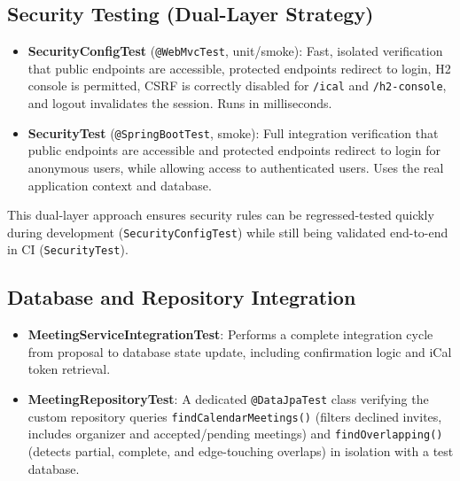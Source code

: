 \documentclass[11pt]{article}
\begin{document}
  \subsection{Security Testing (Dual-Layer Strategy)}
  \begin{itemize}
    \item \textbf{SecurityConfigTest} (\texttt{@WebMvcTest}, unit/smoke): Fast, isolated verification that public endpoints are accessible, protected endpoints redirect to login, H2 console is permitted, CSRF is correctly disabled for \texttt{/ical} and \texttt{/h2-console}, and logout invalidates the session. Runs in milliseconds.
    \item \textbf{SecurityTest} (\texttt{@SpringBootTest}, smoke): Full integration verification that public endpoints are accessible and protected endpoints redirect to login for anonymous users, while allowing access to authenticated users. Uses the real application context and database.
  \end{itemize}
  This dual-layer approach ensures security rules can be regressed-tested quickly during development (\texttt{SecurityConfigTest}) while still being validated end-to-end in CI (\texttt{SecurityTest}).

  \subsection{Database and Repository Integration}
  \begin{itemize}
    \item \textbf{MeetingServiceIntegrationTest}: Performs a complete integration cycle from proposal to database state update, including confirmation logic and iCal token retrieval.
    \item \textbf{MeetingRepositoryTest}: A dedicated \texttt{@DataJpaTest} class verifying the custom repository queries \texttt{findCalendarMeetings()} (filters declined invites, includes organizer and accepted/pending meetings) and \texttt{findOverlapping()} (detects partial, complete, and edge-touching overlaps) in isolation with a test database.
  \end{itemize}
\end{document}

